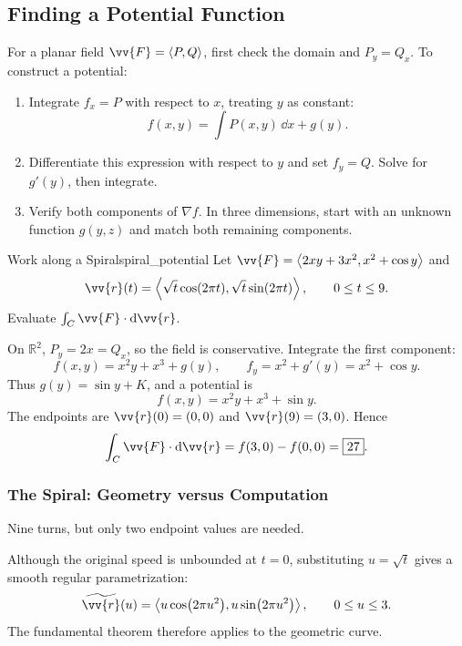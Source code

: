 \subsection{Finding a Potential Function}
For a planar field $\vv{F} = \ang{P,Q}$, first check the domain and $P_y = Q_x$. To construct a potential:
\begin{enumerate}
    \item Integrate $f_x = P$ with respect to $x$, treating $y$ as constant:
    \[
        f(x,y) = \int P(x,y)\,\dd{x} + g(y).
    \]
    \item Differentiate this expression with respect to $y$ and set $f_y = Q$. Solve for $g'(y)$, then integrate.
    \item Verify both components of $\nabla f$. In three dimensions, start with an unknown function $g(y,z)$ and match both remaining components.
\end{enumerate}

\begin{problem}{Work along a Spiral}{spiral_potential}
Let $\vv{F} = \ang{2xy + 3x^2,x^2 + \cos y}$ and
\[
    \vv{r}(t) = \ang{\sqrt{t}\cos(2\pi t),\sqrt{t}\sin(2\pi t)},\qquad 0 \le t \le 9.
\]
Evaluate $\int_C\vv{F}\cdot\dd{\vv{r}}$.
\end{problem}
\begin{sol}
On $\mathbb{R}^2$, $P_y = 2x = Q_x$, so the field is conservative. Integrate the first component:
\[
    f(x,y) = x^2y + x^3 + g(y),\qquad
    f_y = x^2 + g'(y) = x^2 + \cos y.
\]
Thus $g(y) = \sin y + K$, and a potential is
\[
    f(x,y) = x^2y + x^3 + \sin y.
\]
The endpoints are $\vv{r}(0) = (0,0)$ and $\vv{r}(9) = (3,0)$. Hence
\[
    \int_C\vv{F}\cdot\dd{\vv{r}} = f(3,0) - f(0,0) = \boxed{27}.
\]
\end{sol}

\newpage
\subsubsection{The Spiral: Geometry versus Computation}
\begin{center}
\par
\small Nine turns, but only two endpoint values are needed.
\end{center}
Although the original speed is unbounded at $t = 0$, substituting $u = \sqrt{t}$ gives a smooth regular parametrization:
\[
    \widetilde{\vv{r}}(u) = \ang{u\cos(2\pi u^2),u\sin(2\pi u^2)},\qquad 0 \le u \le 3.
\]
The fundamental theorem therefore applies to the geometric curve.

